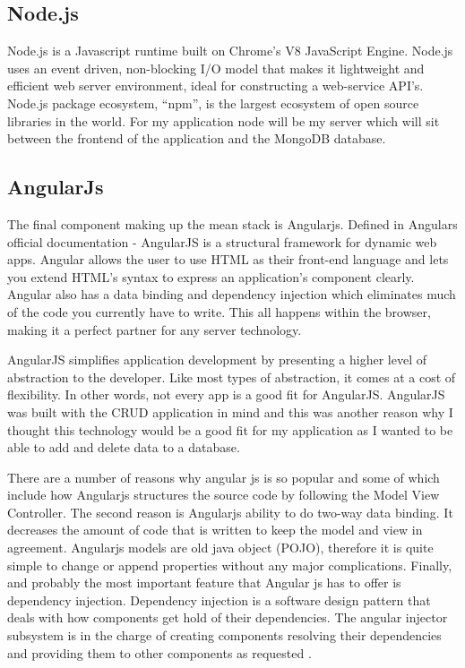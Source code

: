 \subsection{Node.js}

Node.js is a Javascript runtime built on Chrome’s V8 JavaScript Engine.
Node.js uses an event driven, non-blocking I/O model that makes it lightweight
and efficient web server environment, ideal for constructing a web-service
API’s. Node.js package ecosystem, “npm”, is the largest ecosystem of open
source libraries in the world. For my application node will be my server which will sit between the frontend of the application and the MongoDB database.\cite{nodejs}

\subsection{AngularJs}
The final component making up the mean stack is Angularjs. Defined in Angulars official documentation\cite{angularjs} - AngularJS is a structural framework for dynamic
web apps. Angular allows the user to use HTML as their front-end language and lets you extend HTML’s syntax to express an application’s component clearly. Angular also has a data binding and dependency injection which eliminates much
of the code you currently have to write. This all happens within the
browser, making it a perfect partner for any server technology.

AngularJS simplifies application development by presenting a higher level of abstraction to the developer. Like most types of abstraction, it comes at a cost of flexibility. In other words, not every app is a good fit for AngularJS. AngularJS was built with the CRUD application in mind and this was another reason why I thought this technology would be a good fit for my application as I wanted to be able to add and delete data to a database. \cite{angularjsa}
 
There are a number of reasons why angular js is so popular and some of which include how Angularjs structures the source code by following
the Model View Controller. The second reason is  Angularjs ability to do two-way data binding. It decreases the amount of code
that is written to keep the model and view in agreement.  Angularjs
models are old java object (POJO), therefore it is quite simple to change or
append properties without any major complications. Finally, and probably the most important
feature that Angular js has to offer is dependency injection. Dependency injection
is a software design pattern that deals with how components get hold of
their dependencies. The angular injector subsystem is in the charge of creating
components resolving their dependencies and providing them to other
components as requested \cite{angularjsfeat}.

